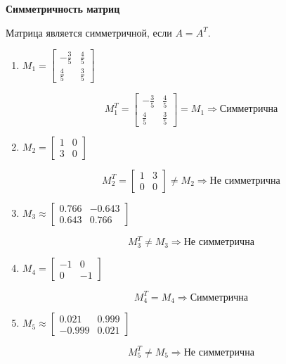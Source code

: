 \textbf{Симметричность матриц}

Матрица является симметричной, если $A = A^T$.

\begin{enumerate}
  \item $M_1 = 
  \begin{bmatrix}
    -\frac{3}{5} & \frac{4}{5} \\
    \frac{4}{5} & \frac{3}{5}
  \end{bmatrix}$

  \[
    M_1^T = 
    \begin{bmatrix}
      -\frac{3}{5} & \frac{4}{5} \\
      \frac{4}{5} & \frac{3}{5}
    \end{bmatrix} = M_1 \Rightarrow \text{Симметрична}
  \]

  \item $M_2 = 
  \begin{bmatrix}
    1 & 0 \\
    3 & 0
  \end{bmatrix}$

  \[
    M_2^T = 
    \begin{bmatrix}
      1 & 3 \\
      0 & 0
    \end{bmatrix} \neq M_2 \Rightarrow \text{Не симметрична}
  \]

  \item $M_3 \approx 
  \begin{bmatrix}
    0.766 & -0.643 \\
    0.643 & 0.766
  \end{bmatrix}$

  \[
    M_3^T \neq M_3 \Rightarrow \text{Не симметрична}
  \]

  \item $M_4 = 
  \begin{bmatrix}
    -1 & 0 \\
    0 & -1
  \end{bmatrix}$

  \[
    M_4^T = M_4 \Rightarrow \text{Симметрична}
  \]

  \item $M_5 \approx 
  \begin{bmatrix}
    0.021 & 0.999 \\
    -0.999 & 0.021
  \end{bmatrix}$

  \[
    M_5^T \neq M_5 \Rightarrow \text{Не симметрична}
  \]


\end{enumerate}
